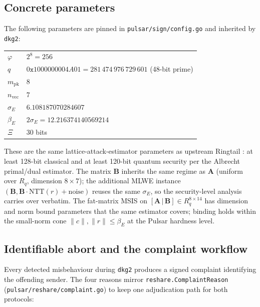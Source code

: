 \subsection{Concrete parameters}
\label{ssec:pedersen-params}

The following parameters are pinned in \texttt{pulsar/sign/config.go}
and inherited by \texttt{dkg2}:

\begin{tabular}{ll}
\toprule
$\varphi$           & $2^8 = 256$ \\
$q$                 & $0\mathtt{x}1000000004A01 = 281\,474\,976\,729\,601$ (48-bit prime) \\
$m_{\textrm{pk}}$   & $8$ \\
$n_{\textrm{vec}}$  & $7$ \\
$\sigma_E$          & $6.108187070284607$ \\
$\beta_E$           & $2\sigma_E = 12.216374140569214$ \\
$\Xi$               & $30$ bits \\
\bottomrule
\end{tabular}

These are the same lattice-attack-estimator parameters as upstream
Ringtail \cite{ringtail2025}: at least 128-bit classical and at least
120-bit quantum security per the Albrecht primal/dual estimator. The
matrix $\mathbf{B}$ inherits the same regime as $\mathbf{A}$
(uniform over $R_q$, dimension $8\times 7$); the additional MLWE
instance $(\mathbf{B}, \mathbf{B}\cdot\mathrm{NTT}(r) + \mathrm{noise})$
reuses the same $\sigma_E$, so the security-level analysis carries
over verbatim. The fat-matrix MSIS on
$[\mathbf{A}\,|\,\mathbf{B}]\in R_q^{8\times 14}$ has dimension and
norm bound parameters that the same estimator covers; binding holds
within the small-norm cone $\|c\|,\|r\|\le\beta_E$ at the Pulsar
hardness level.

\subsection{Identifiable abort and the complaint workflow}
\label{ssec:pedersen-complaint}

Every detected misbehaviour during \texttt{dkg2} produces a signed
complaint identifying the offending sender. The four reasons mirror
\texttt{reshare.ComplaintReason} (\texttt{pulsar/reshare/complaint.go})
to keep one adjudication path for both protocols:

